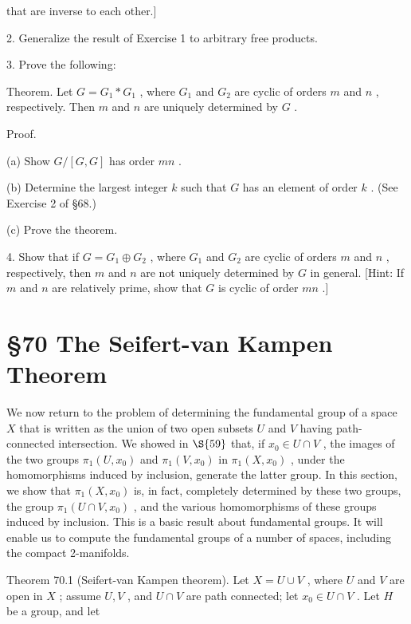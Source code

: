 that are inverse to each other.]

2. Generalize the result of Exercise 1 to arbitrary free products.

3. Prove the following:

Theorem. Let \(G = {G}_{1} * {G}_{1}\) , where \({G}_{1}\) and \({G}_{2}\) are cyclic of orders \(m\) and \(n\) , respectively. Then \(m\) and \(n\) are uniquely determined by \(G\) .

Proof.

(a) Show \(G/\left\lbrack  {G,G}\right\rbrack\) has order \({mn}\) .

(b) Determine the largest integer \(k\) such that \(G\) has an element of order \(k\) . (See Exercise 2 of  \S 68.)

(c) Prove the theorem.

4. Show that if \(G = {G}_{1} \oplus  {G}_{2}\) , where \({G}_{1}\) and \({G}_{2}\) are cyclic of orders \(m\) and \(n\) , respectively, then \(m\) and \(n\) are not uniquely determined by \(G\) in general. [Hint: If \(m\) and \(n\) are relatively prime, show that \(G\) is cyclic of order \({mn}\) .]

\section*{ \S 70 The Seifert-van Kampen Theorem}

We now return to the problem of determining the fundamental group of a space \(X\) that is written as the union of two open subsets \(U\) and \(V\) having path-connected intersection. We showed in \( \S {59}\) that, if \({x}_{0} \in  U \cap  V\) , the images of the two groups \({\pi }_{1}\left( {U,{x}_{0}}\right)\) and \({\pi }_{1}\left( {V,{x}_{0}}\right)\) in \({\pi }_{1}\left( {X,{x}_{0}}\right)\) , under the homomorphisms induced by inclusion, generate the latter group. In this section, we show that \({\pi }_{1}\left( {X,{x}_{0}}\right)\) is, in fact, completely determined by these two groups, the group \({\pi }_{1}\left( {U \cap  V,{x}_{0}}\right)\) , and the various homomorphisms of these groups induced by inclusion. This is a basic result about fundamental groups. It will enable us to compute the fundamental groups of a number of spaces, including the compact 2-manifolds.

Theorem 70.1 (Seifert-van Kampen theorem). Let \(X = U \cup  V\) , where \(U\) and \(V\) are open in \(X\) ; assume \(U,V\) , and \(U \cap  V\) are path connected; let \({x}_{0} \in  U \cap  V\) . Let \(H\) be a group, and let

